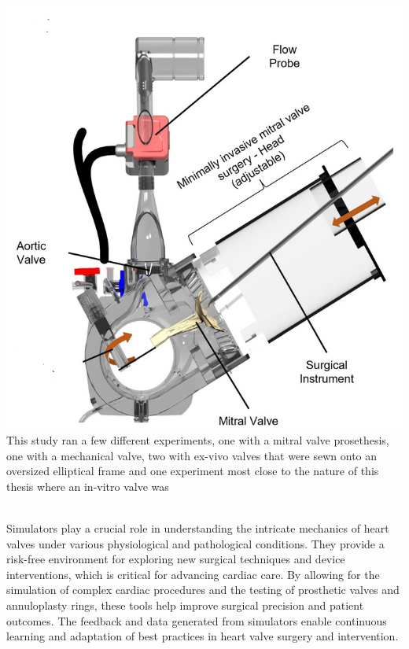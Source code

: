 \begin{itemize}
{              \includegraphics[width=\linewidth]{figures/karl1.jpg}
              \label{fig:k2}
          }
          This study ran a few different experiments, one with a mitral valve prosethesis, one with a mechanical valve, two with ex-vivo valves that were sewn onto an oversized elliptical frame and one experiment most close to the nature of this thesis where an in-vitro valve was
\end{itemize}

\\
Simulators play a crucial role in understanding the intricate mechanics of heart valves under various physiological and pathological conditions. They provide a risk-free environment for exploring new surgical techniques and device interventions, which is critical for advancing cardiac care. By allowing for the simulation of complex cardiac procedures and the testing of prosthetic valves and annuloplasty rings, these tools help improve surgical precision and patient outcomes. The feedback and data generated from simulators enable continuous learning and adaptation of best practices in heart valve surgery and intervention.

